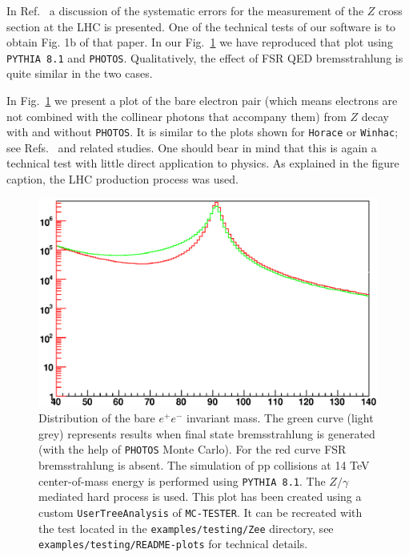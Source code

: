 \documentclass[]{Photos_interface_design}
\begin{document}
In Ref.~\cite{Adam:2008ge} a discussion of the systematic errors for the measurement of the $Z$ cross 
section at the LHC is presented. One of the technical tests of our software is to obtain
Fig. 1b of that paper. In our Fig.~\ref{fig:lineshape} we have 
reproduced that plot using {\tt PYTHIA 8.1} and {\tt PHOTOS}. Qualitatively, the effect
of FSR QED bremsstrahlung is quite similar in the two cases. 


In  Fig.~\ref{fig:lineshape} we present a plot of the bare electron pair 
(which means electrons are not combined with the collinear photons that accompany them) from $Z$
 decay with and without {\tt PHOTOS}. It is similar to
the plots shown for {\tt Horace} or {\tt Winhac}; see Refs.~\cite{CarloniCalame:2003ux,Winhac} and related
studies.
One should bear in mind that this is again a technical test with little 
direct application to physics. As explained in the figure caption, the LHC production process was used.
\begin{figure}[h!]
\centering
\includegraphics[scale=0.85]{lineshape.eps}
\caption{Distribution of the bare $e^+e^-$ invariant mass. The green curve 
(light grey) represents results when final state 
bremsstrahlung is generated (with the help of {\tt PHOTOS} Monte Carlo). For the red curve FSR 
bremsstrahlung is absent.
The simulation of pp collisions at 14 TeV center-of-mass energy is performed using {\tt PYTHIA 8.1}.
The $Z/\gamma$ mediated hard process is used.
This plot has been created using a custom {\tt UserTreeAnalysis} of {\tt MC-TESTER}.
It can be recreated with the test located in the {\tt examples/testing/Zee} directory, see  {\tt examples/testing/README-plots} for technical details.
\label{fig:lineshape}
}
\end{figure}
\end{document}
